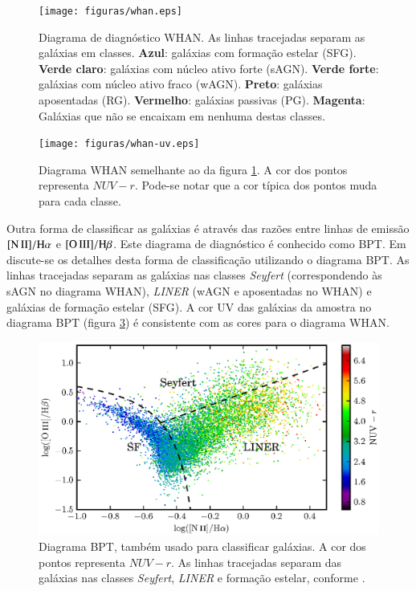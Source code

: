 \begin{figure}
	\texttt{[image: figuras/whan.eps]}
	\caption[Diagrama de diagnóstico WHAN.]
	{Diagrama de diagnóstico WHAN. As linhas tracejadas separam as galáxias
	em classes. \textbf{Azul}: galáxias com formação estelar (SFG). \textbf{Verde
	claro}: galáxias com núcleo ativo forte (sAGN). \textbf{Verde forte}:
	galáxias com núcleo ativo fraco (wAGN). \textbf{Preto}: galáxias aposentadas
	(RG). \textbf{Vermelho}: galáxias passivas (PG). \textbf{Magenta}: Galáxias
	que não se encaixam em nenhuma destas classes.}
	\label{fig:Whan}
\end{figure}

\begin{figure}
	\texttt{[image: figuras/whan-uv.eps]}
	\caption[Cores ultravioleta no diagrama WHAN.]
	{Diagrama WHAN semelhante ao da figura \ref{fig:Whan}. A cor dos pontos
	representa $NUV-r$. Pode-se notar que a cor típica dos pontos muda para cada
	classe.}
	\label{fig:WhanUV}
\end{figure}

Outra forma de classificar as galáxias é através das razões entre linhas de
emissão $\nII/\Halpha$ e $\oIII/\Hbeta$. Este diagrama de diagnóstico é
conhecido como BPT. Em \citet{CidFernandes2010} discute-se os detalhes desta
forma de classificação utilizando o diagrama BPT. As linhas tracejadas separam
as galáxias nas classes {\em Seyfert} (correspondendo às sAGN no diagrama WHAN),
{\em LINER} (wAGN e aposentadas no WHAN) e galáxias de formação estelar (SFG). A
cor UV das galáxias da amostra no diagrama BPT (figura \ref{fig:BPTUV}) é
consistente com as cores para o diagrama WHAN.

\begin{figure}
	\includegraphics{figuras/bpt-uv.eps}
	\caption[Cores ultravioleta no diagrama BPT.]
	{Diagrama BPT, também usado para classificar galáxias. A cor dos
	pontos representa $NUV-r$. As linhas tracejadas separam das galáxias nas
	classes {\em Seyfert}, {\em LINER} e formação estelar, conforme
	\citet[linhas S06 e K06 da tabela 1]{CidFernandes2010}.}
	\label{fig:BPTUV}
\end{figure}


